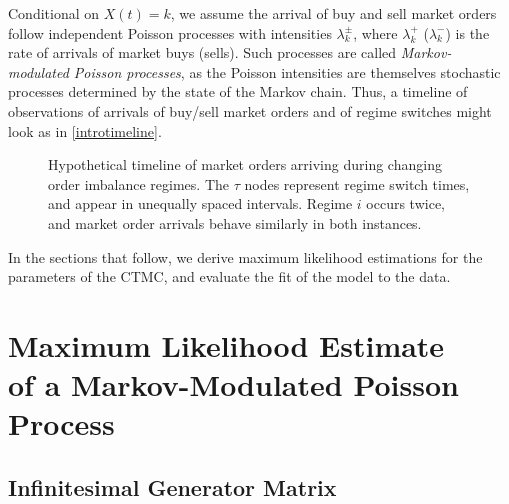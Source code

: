 Conditional on $X(t) = k$, we assume the arrival of buy and sell market orders follow independent Poisson processes with intensities $\lambda_k^\pm$, where $\lambda_k^+$ ($\lambda_k^-$) is the rate of arrivals of market buys (sells). Such processes are called \textit{Markov-modulated Poisson processes}, as the Poisson intensities are themselves stochastic processes determined by the state of the Markov chain. Thus, a timeline of observations of arrivals of buy/sell market orders and of regime switches might look as in \autoref{introtimeline}.

\begin{figure}
  \resizebox{\linewidth}{!}{}
\caption[Hypothetical timeline of market orders and imbalance regime switches]{Hypothetical timeline of market orders arriving during changing order imbalance regimes. The $\tau$ nodes represent regime switch times, and appear in unequally spaced intervals. Regime $i$ occurs twice, and market order arrivals behave similarly in both instances.}
\label{introtimeline}
\end{figure}

In the sections that follow, we derive maximum likelihood estimations for the parameters of the CTMC, and evaluate the fit of the model to the data.

\section[Maximum Likelihood Estimate of a Markov-Modulated Poisson Process]{Maximum Likelihood Estimate \texorpdfstring{\\}{} of a Markov-Modulated Poisson Process}

\subsection{Infinitesimal Generator Matrix}


